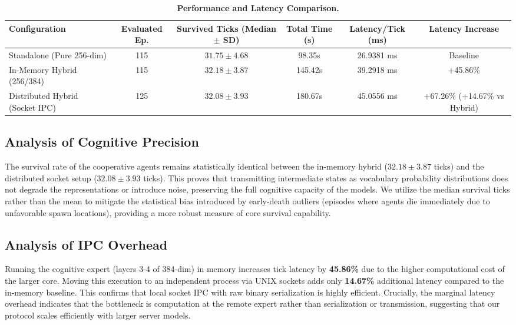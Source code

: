 \documentclass{article}
\begin{document}
\begin{table}[h]
\centering
\caption{\textbf{Performance and Latency Comparison.}}
\label{tab:benchmark_results}
\begin{tabular}{l c c c c c}
\toprule
\textbf{Configuration} & \textbf{Evaluated Ep.} & \textbf{Survived Ticks (Median $\pm$ SD)} & \textbf{Total Time (s)} & \textbf{Latency/Tick (ms)} & \textbf{Latency Increase} \\
\midrule
Standalone (Pure 256-dim) & 115 & $31.75 \pm 4.68$ & 98.35s & 26.9381 ms & Baseline \\
In-Memory Hybrid (256/384) & 115 & $32.18 \pm 3.87$ & 145.42s & 39.2918 ms & +45.86\% \\
Distributed Hybrid (Socket IPC) & 125 & $32.08 \pm 3.93$ & 180.67s & 45.0556 ms & +67.26\% (+14.67\% vs Hybrid) \\
\bottomrule
\end{tabular}
\end{table}

\subsection{Analysis of Cognitive Precision}
The survival rate of the cooperative agents remains statistically identical between the in-memory hybrid ($32.18 \pm 3.87$ ticks) and the distributed socket setup ($32.08 \pm 3.93$ ticks). This proves that transmitting intermediate states as vocabulary probability distributions does not degrade the representations or introduce noise, preserving the full cognitive capacity of the models. We utilize the median survival ticks rather than the mean to mitigate the statistical bias introduced by early-death outliers (episodes where agents die immediately due to unfavorable spawn locations), providing a more robust measure of core survival capability.

\subsection{Analysis of IPC Overhead}
Running the cognitive expert (layers 3-4 of 384-dim) in memory increases tick latency by \textbf{45.86\%} due to the higher computational cost of the larger core. Moving this execution to an independent process via UNIX sockets adds only \textbf{14.67\%} additional latency compared to the in-memory baseline. This confirms that local socket IPC with raw binary serialization is highly efficient. Crucially, the marginal latency overhead indicates that the bottleneck is computation at the remote expert rather than serialization or transmission, suggesting that our protocol scales efficiently with larger server models.
\end{document}
